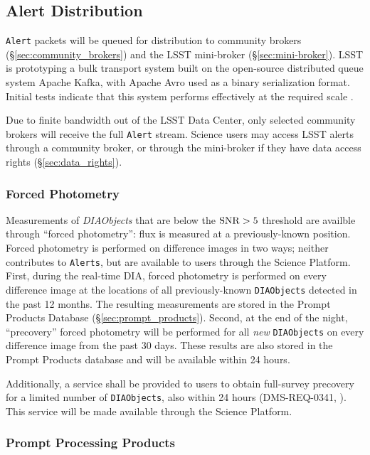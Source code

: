 \subsection{Alert Distribution}

\texttt{Alert} packets will be queued for distribution to community brokers (\S \ref{sec:community_brokers}) and the LSST mini-broker (\S \ref{sec:mini-broker}). 
LSST is prototyping  a bulk transport system built on the open-source distributed queue system Apache Kafka, with Apache Avro used as a binary serialization format.
Initial tests indicate that this system performs effectively at the required scale .

Due to finite bandwidth out of the LSST Data Center, only selected community brokers will receive the full \texttt{Alert} stream.
Science users may access LSST alerts through a community broker, or through the mini-broker if they have data access rights (\S \ref{sec:data_rights}).



\subsubsection{Forced Photometry}\label{sssec:AGP_force}

Measurements of \textit{DIAObjects} that are below the ${\rm SNR} > 5$ threshold are availble through ``forced photometry'': flux is measured at a previously-known position.
Forced photometry is performed on difference images in two ways; neither contributes to \texttt{Alerts}, but are available to users through the Science Platform.
First, during the real-time DIA, forced photometry is performed on every difference image at the locations of all previously-known {\tt DIAObjects} detected in the past 12 months. 
The resulting measurements are stored in the Prompt Products Database (\S \ref{sec:prompt_products}).
Second, at the end of the night, ``precovery'' forced photometry will be performed for all \textit{new} \texttt{DIAObjects} on every difference image from the past 30 days.
These results are also stored in the Prompt Products database and will be available within 24 hours.
 
Additionally, a service shall be provided to users to obtain full-survey precovery for a limited number of {\tt DIAObjects}, also within 24 hours (DMS-REQ-0341, ).
This service will be made available through the Science Platform.

\subsubsection{Prompt Processing Products}

